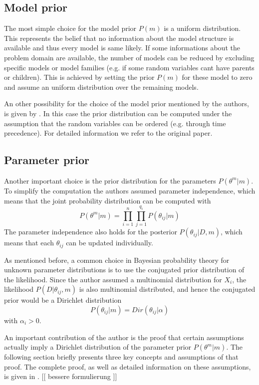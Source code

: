 \documentclass{article}
\begin{document}
	\subsection{Model prior}
	\label{sec:model_prior}
	The most simple choice for the model prior $P(m)$ is a uniform distribution. This represents 
	the belief that no information about the model structure is	available and thus every 
	model is same likely. If some informations about the problem domain are available, the number 
	of models can be reduced by excluding specific models or model families (e.g. if some random
	variables cant have parents or children). This is achieved by setting
	the prior $P(m)$ for these model to zero and assume an uniform distribution over the remaining
	models.	
	
	An other possibility for the choice of the model prior mentioned by the authors, is given
	by \cite{buntine}. In this case the prior distribution can be computed under the assumption that
	the random variables can be ordered (e.g. through time precedence). For detailed information we
	refer to the original paper.
	
	\subsection{Parameter prior}
	\label{sec:parameter_prior}
	Another important choice is the prior distribution for the parameters $P(\theta^m|m)$. To simplify
	the computation the authors assumed parameter independence, which means that the joint probability
	distribution can be computed with
	\[
		P(\theta^m|m)= \prod_{i=1}^n \prod_{j=1}^{q_i} P(\theta_{ij}|m)
	\]
	The parameter independence also holds for the posterior $P(\theta_{ij}|D,m)$, which means
	that each $\theta_{ij}$ can be updated individually.
	
	As mentioned before, a common choice in Bayesian probability theory for unknown parameter distributions
	is to use the conjugated prior distribution of the likelihood.
	Since the author assumed a multinomial distribution
	for $X_i$, the likelihood $P(D|\theta_{ij},m)$ is also multinomial distributed, and hence the
	conjugated prior would be a Dirichlet distribution
	\[
		P(\theta_{ij}|m) = Dir(\theta_{ij}|\alpha)
	\]
	with $\alpha_i > 0$.
	
	An important contribution of the author is the proof that certain assumptions actually 
	imply a Dirichlet distribution of the parameter prior $P(\theta^m|m)$.
	The following section briefly presents three key concepts and assumptions of that proof.
	The complete proof, as well as detailed information on these assumptions, is given in \cite{hcg}.
	[[ bessere formulierung ]]
	
\end{document}
